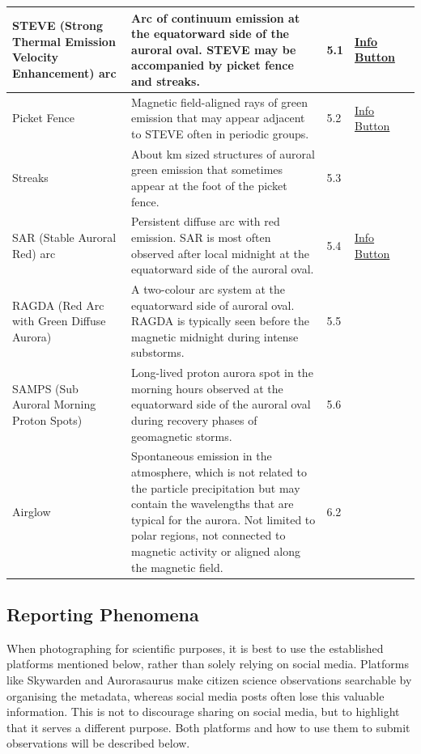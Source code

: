 \documentclass{article}
\begin{document}
\begin{longtable}{|p{1.5cm}|p{6.5cm}|p{1cm}|p{1.75cm}|p{1.8cm}|}
STEVE (Strong Thermal Emission Velocity Enhancement) arc & Arc of continuum emission at the equatorward side of the auroral oval. STEVE may be accompanied by picket fence and streaks. & 5.1 & \href{https://www.taivaanvahti.fi/observations/info/545/en}{Info Button} &  \\
\hline
Picket Fence & Magnetic field-aligned rays of green emission that may appear adjacent to STEVE often in periodic groups. & 5.2 & \href{https://www.taivaanvahti.fi/observations/info/961/en}{Info Button} & \textcite{Semeter2020}\\
\hline
Streaks & About km sized structures of auroral green emission that sometimes appear at the foot of the picket fence. & 5.3 &  & \textcite{Semeter2020} \\
\hline
SAR (Stable Auroral Red) arc & Persistent diffuse arc with red emission. SAR is most often observed after local midnight at the equatorward side of the auroral oval. & 5.4 & \href{https://www.taivaanvahti.fi/observations/info/528/en}{Info Button} & \textcite{Hoch1973} \\
\hline
RAGDA (Red Arc with Green Diffuse Aurora) & A two-colour arc system at the equatorward side of auroral oval. RAGDA is typically seen before the magnetic midnight during intense substorms. & 5.5 &  &  \textcite{Nishimura2022}\\
\hline
SAMPS (Sub Auroral Morning Proton Spots) & Long-lived proton aurora spot in the morning hours observed at the equatorward side of the auroral oval during recovery phases of geomagnetic storms. & 5.6 &  & \textcite{Frey2004} \\
\hline

Airglow & Spontaneous emission in the atmosphere, which is not related to the particle precipitation but may contain the wavelengths that are typical for the aurora. Not limited to polar regions, not connected to magnetic activity or aligned along the magnetic field. & 6.2 &  &  \\
\hline

\end{longtable}


\subsection{Reporting Phenomena}
When photographing for scientific purposes, it is best to use the established platforms mentioned below, rather than solely relying on social media. Platforms like Skywarden and Aurorasaurus make citizen science observations searchable by organising the metadata, whereas social media posts often lose this valuable information. This is not to discourage sharing on social media, but to highlight that it serves a different purpose. Both platforms and how to use them to submit observations will be described below.
\end{document}
